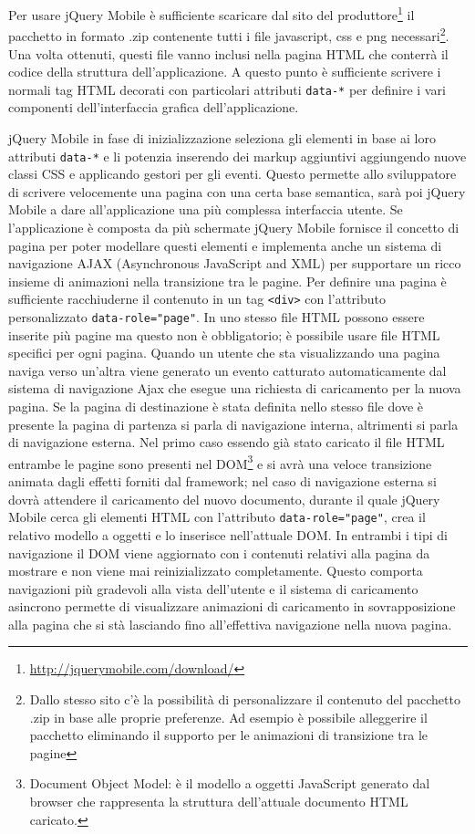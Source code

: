 			Per usare jQuery Mobile è sufficiente scaricare dal sito del
			produttore\footnote{\url{http://jquerymobile.com/download/}} il
			pacchetto in formato .zip contenente tutti i file javascript, css e
			png necessari\footnote{Dallo stesso sito c'è la possibilità di
			personalizzare il contenuto del pacchetto .zip in base alle proprie
			preferenze. Ad esempio è possibile alleggerire il pacchetto
			eliminando il supporto per le animazioni di transizione tra le
			pagine}. Una volta ottenuti, questi file vanno inclusi nella pagina
			HTML che conterrà il codice della struttura dell'applicazione. A
			questo punto è sufficiente scrivere i normali tag HTML decorati con
			particolari attributi \verb|data-*| per definire i vari componenti
			dell'interfaccia grafica dell'applicazione.
			
			jQuery Mobile in fase di inizializzazione seleziona gli elementi in
			base ai loro attributi \verb|data-*| e li potenzia inserendo dei markup
			aggiuntivi aggiungendo nuove classi CSS e applicando gestori per gli
			eventi.	Questo permette allo sviluppatore di scrivere velocemente
			una pagina con una certa base semantica, sarà poi jQuery Mobile a
			dare all'applicazione una più complessa interfaccia utente.	Se
			l'applicazione è composta da più schermate jQuery Mobile fornisce 
			il concetto di pagina per poter modellare questi elementi e
			implementa anche un sistema di navigazione AJAX (Asynchronous
			JavaScript and XML) per supportare un ricco insieme di animazioni
			nella transizione tra le pagine. Per definire una pagina è
			sufficiente racchiuderne il contenuto in un tag \verb|<div>| con
			l'attributo personalizzato \verb|data-role="page"|.	In uno stesso
			file HTML possono essere inserite più pagine ma questo non è
			obbligatorio; è possibile usare file HTML specifici per ogni pagina.
			Quando un utente che sta visualizzando una pagina naviga verso
			un'altra viene generato un evento catturato automaticamente dal
			sistema di navigazione Ajax che esegue una richiesta di caricamento
			per la nuova pagina. Se la pagina di destinazione è stata definita
			nello stesso file dove è presente la pagina di partenza si parla di
			navigazione interna, altrimenti si parla di navigazione esterna. Nel
			primo caso essendo già stato caricato il file HTML entrambe le
			pagine sono presenti nel DOM\footnote{Document Object Model: è il
			modello a oggetti JavaScript generato dal browser che rappresenta la
			struttura dell'attuale documento HTML caricato.} e si avrà una
			veloce transizione animata dagli effetti forniti dal framework;
			nel caso di navigazione esterna si dovrà attendere il caricamento
			del nuovo documento, durante il quale jQuery Mobile cerca gli
			elementi HTML con l'attributo \verb|data-role="page"|, crea il
			relativo modello a oggetti e lo inserisce nell'attuale DOM.	In
			entrambi i tipi di navigazione il DOM viene aggiornato con i
			contenuti relativi alla pagina da mostrare e non viene mai
			reinizializzato completamente. Questo comporta navigazioni più
			gradevoli alla vista dell'utente e il sistema di caricamento
			asincrono permette di visualizzare animazioni di caricamento in
			sovrapposizione alla pagina che si stà lasciando fino all'effettiva
			navigazione nella nuova pagina.
			
